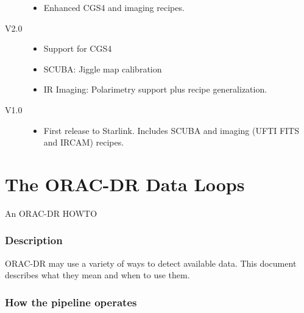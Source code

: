 \documentclass[twoside,11pt]{article}
\renewcommand{\_}{\texttt{\symbol{95}}}
\begin{document}
\begin{description}
\begin{itemize}
\item Enhanced CGS4 and imaging recipes.

\end{itemize}

\item[V2.0]

\begin{itemize}

\item Support for CGS4

\item SCUBA: Jiggle map calibration

\item IR Imaging: Polarimetry support plus recipe generalization.

\end{itemize}

\item[V1.0]

\begin{itemize}

\item First release to Starlink. Includes SCUBA and imaging (UFTI FITS
and IRCAM) recipes.

\end{itemize}

\end{description}


\appendix


\section{The ORAC-DR Data Loops\label{The_ORAC-DR_Data_Loops}}


An ORAC-DR HOWTO

\subsubsection*{Description\label{The_ORAC-DR_Data_Loops_Description}}


ORAC-DR may use a variety of ways to detect available data. This
document describes what they mean and when to use them.

\subsubsection*{How the pipeline operates\label{The_ORAC-DR_Data_Loops_How_the_pipeline_operates}}
\end{document}
